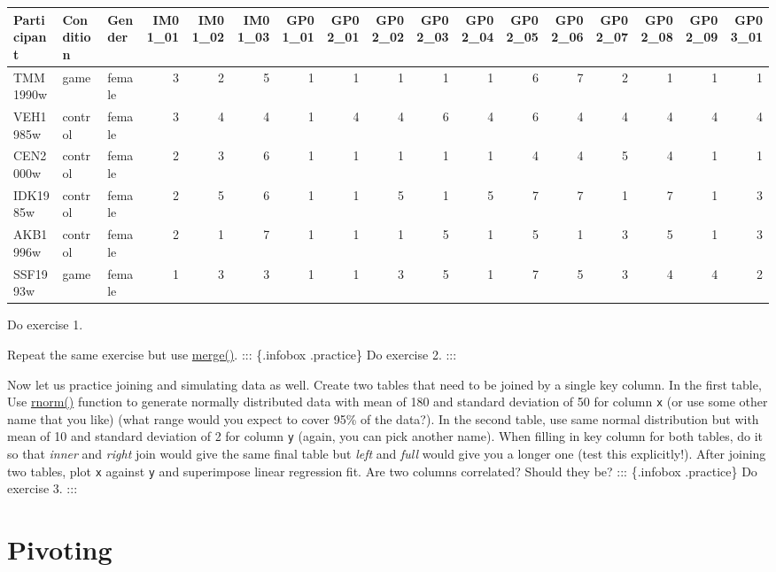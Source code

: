 \documentclass[
]{book}
\begin{document}
\begin{tabular}{l|l|l|r|r|r|r|r|r|r|r|r|r|r|r|r|r}
\hline
Participant & Condition & Gender & IM01\_01 & IM01\_02 & IM01\_03 & GP01\_01 & GP02\_01 & GP02\_02 & GP02\_03 & GP02\_04 & GP02\_05 & GP02\_06 & GP02\_07 & GP02\_08 & GP02\_09 & GP03\_01\\
\hline
TMM1990w & game & female & 3 & 2 & 5 & 1 & 1 & 1 & 1 & 1 & 6 & 7 & 2 & 1 & 1 & 1\\
\hline
VEH1985w & control & female & 3 & 4 & 4 & 1 & 4 & 4 & 6 & 4 & 6 & 4 & 4 & 4 & 4 & 4\\
\hline
CEN2000w & control & female & 2 & 3 & 6 & 1 & 1 & 1 & 1 & 1 & 4 & 4 & 5 & 4 & 1 & 1\\
\hline
IDK1985w & control & female & 2 & 5 & 6 & 1 & 1 & 5 & 1 & 5 & 7 & 7 & 1 & 7 & 1 & 3\\
\hline
AKB1996w & control & female & 2 & 1 & 7 & 1 & 1 & 1 & 5 & 1 & 5 & 1 & 3 & 5 & 1 & 3\\
\hline
SSF1993w & game & female & 1 & 3 & 3 & 1 & 1 & 3 & 5 & 1 & 7 & 5 & 3 & 4 & 4 & 2\\
\hline
\end{tabular}

Do exercise 1.

Repeat the same exercise but use \href{https://stat.ethz.ch/R-manual/R-devel/library/base/html/merge.html}{merge()}.
::: \{.infobox .practice\}
Do exercise 2.
:::

Now let us practice joining and simulating data as well. Create two tables that need to be joined by a single key column. In the first table, Use \href{https://stat.ethz.ch/R-manual/R-devel/library/stats/html/Normal.html}{rnorm()} function to generate normally distributed data with mean of 180 and standard deviation of 50 for column \texttt{x} (or use some other name that you like) (what range would you expect to cover 95\% of the data?). In the second table, use same normal distribution but with mean of 10 and standard deviation of 2 for column \texttt{y} (again, you can pick another name). When filling in key column for both tables, do it so that \emph{inner} and \emph{right} join would give the same final table but \emph{left} and \emph{full} would give you a longer one (test this explicitly!). After joining two tables, plot \texttt{x} against \texttt{y} and superimpose linear regression fit. Are two columns correlated? Should they be?
::: \{.infobox .practice\}
Do exercise 3.
:::

\hypertarget{pivoting}{%
\section{Pivoting}\label{pivoting}}
\end{document}
